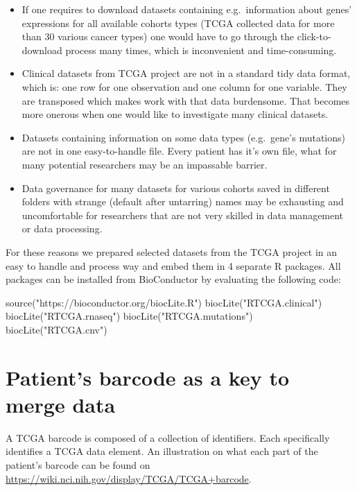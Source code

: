 \begin{itemize}
\itemsep1pt\parskip0pt
\item
  If one requires to download datasets containing e.g.~information about
  genes' expressions for all available cohorts types (TCGA collected
  data for more than 30 various cancer types) one would have to go
  through the click-to-download process many times, which is
  inconvenient and time-consuming.
\item
  Clinical datasets from TCGA project are not in a standard tidy data
  format, which is: one row for one observation and one column for one
  variable. They are transposed which makes work with that data
  burdensome. That becomes more onerous when one would like to
  investigate many clinical datasets.
\item
  Datasets containing information on some data types (e.g.~gene's
  mutations) are not in one easy-to-handle file. Every patient has it's
  own file, what for many potential researchers may be an impassable
  barrier.
\item
  Data governance for many datasets for various cohorts saved in
  different folders with strange (default after untarring) names may be
  exhausting and uncomfortable for researchers that are not very skilled
  in data management or data processing.
\end{itemize}

For these reasons we prepared selected datasets from the TCGA project in
an easy to handle and process way and embed them in 4 separate R
packages. All packages can be installed from BioConductor by evaluating
the following code:

\begin{Schunk}
\begin{Sinput}
source("https://bioconductor.org/biocLite.R")
biocLite("RTCGA.clinical") 
biocLite("RTCGA.rnaseq") 
biocLite("RTCGA.mutations") 
biocLite("RTCGA.cnv") 
\end{Sinput}
\end{Schunk}

\section{Patient's barcode as a key to merge
data}\label{patients-barcode-as-a-key-to-merge-data}

A TCGA barcode is composed of a collection of identifiers. Each
specifically identifies a TCGA data element. An illustration on what
each part of the patient's barcode can be found on \newline ~
\href{https://wiki.nci.nih.gov/display/TCGA/TCGA+barcode}{\url{https://wiki.nci.nih.gov/display/TCGA/TCGA+barcode}}.

